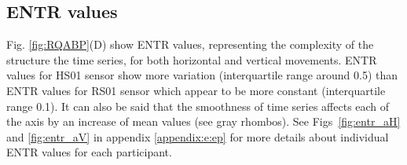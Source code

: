 \subsection*{ENTR values}
Fig. \ref{fig:RQABP}(D) show ENTR values, representing the complexity of 
the structure the time series, for both horizontal and vertical movements.
ENTR values for HS01 sensor show more variation 
(interquartile range around 0.5)
than ENTR values for RS01 sensor which appear 
to be more constant (interquartile range 0.1).
It can also be said that the smoothness of time series affects
each of the axis by an increase of mean values (see gray rhombos).
See Figs~\ref{fig:entr_aH} and \ref{fig:entr_aV} in appendix
\ref{appendix:e:ep}
for more details about individual ENTR values for each participant.
%


